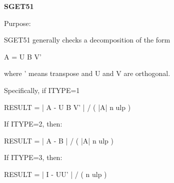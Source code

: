 {\bfseries S\+G\+E\+T51} 

\begin{DoxyParagraph}{Purpose\+: }
\begin{DoxyVerb}      SGET51  generally checks a decomposition of the form

              A = U B V'

      where ' means transpose and U and V are orthogonal.

      Specifically, if ITYPE=1

              RESULT = | A - U B V' | / ( |A| n ulp )

      If ITYPE=2, then:

              RESULT = | A - B | / ( |A| n ulp )

      If ITYPE=3, then:

              RESULT = | I - UU' | / ( n ulp )\end{DoxyVerb}
 
\end{DoxyParagraph}


